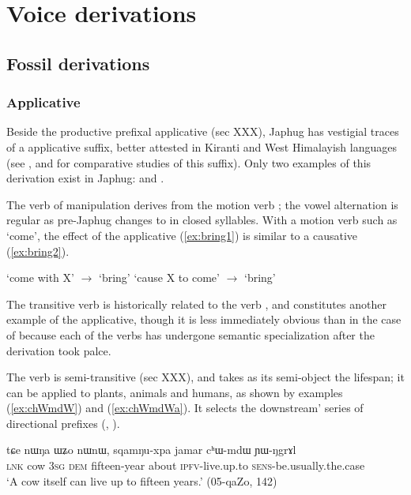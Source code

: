 \chapter{Voice derivations}

\section{Fossil derivations}

\subsection{Applicative }
Beside the productive prefixal  applicative (sec XXX), Japhug has vestigial traces of a  applicative suffix, better attested in Kiranti and West Himalayish languages (see \citealt{michailovsky85dental}, \citet{jacques15derivational.khaling} and \citealt{jacques16ssuffixes} for comparative studies of this suffix). Only two examples of this derivation exist in Japhug:  and . 

The verb of manipulation  derives from the motion verb ; the vowel alternation is regular as pre-Japhug  changes to  in closed syllables. With a motion verb such as `come', the effect of the applicative (\ref{ex:bring1}) is similar to a causative  (\ref{ex:bring2}). 

\begin{exe}
\ex \label{ex:bring1}
\glt `come with X' $\rightarrow$ `bring'
\ex \label{ex:bring2}
\glt `cause X to come' $\rightarrow$ `bring'
\end{exe}

The transitive verb  is historically related to the verb , and constitutes another example of the  applicative, though it is less immediately obvious than in the case of  because each of the verbs has undergone semantic specialization after the derivation took palce.

The verb  is semi-transitive (sec XXX), and takes as its semi-object the lifespan; it can be applied to plants, animals and humans, as shown by examples (\ref{ex:chWmdW}) and (\ref{ex:chWmdWa}). It selects the  downstream' series of directional prefixes (, ).

 \begin{exe}
\ex \label{ex:chWmdW}
\gll tɕe nɯŋa ɯʑo nɯnɯ, sqamŋu-xpa jamar cʰɯ-mdɯ ɲɯ-ŋgrɤl\\
\textsc{lnk} cow \textsc{3sg} \textsc{dem} fifteen-year about \textsc{ipfv}-live.up.to \textsc{sens}-be.usually.the.case \\
\glt `A cow itself can live up to fifteen years.' (05-qaZo, 142)
\end{exe}

